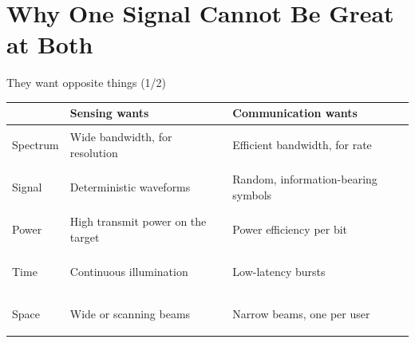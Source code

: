 
\section[The conflict]{Why One Signal Cannot Be Great at Both}


\begin{frame}{They want opposite things (1/2)}
  \vspace{0.2em}
  \scriptsize
  \setlength{\tabcolsep}{4pt}
  \renewcommand{\arraystretch}{1.35}
  \begin{tabularx}{\textwidth}{>{\bfseries\raggedright\arraybackslash}p{1.55cm}
      >{\raggedright\arraybackslash}X >{\raggedright\arraybackslash}X}
    \toprule
    & \textcolor{coreorange}{\textbf{Sensing wants}} & \textcolor{ranblue}{\textbf{Communication wants}} \\
    \midrule
    Spectrum   & Wide bandwidth, for resolution & Efficient bandwidth, for rate \\
    Signal     & Deterministic waveforms & Random, information-bearing symbols \\
    Power      & High transmit power on the target & Power efficiency per bit \\
    Time       & Continuous illumination & Low-latency bursts \\
    Space      & Wide or scanning beams & Narrow beams, one per user \\
    \bottomrule
  \end{tabularx}

  \vspace{0.6em}
\end{frame}

